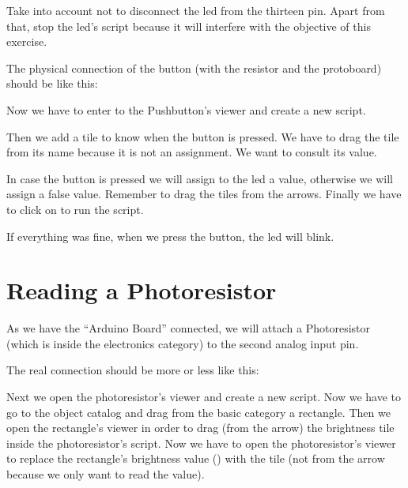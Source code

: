 \documentclass[english]{etoys-guide}
\begin{document}
Take into account not to disconnect the led from the thirteen pin. Apart from
that, stop the led’s script because it will interfere with the objective of
this exercise.

The physical connection of the button (with the resistor and the protoboard)
should be like this:



Now we have to enter to the Pushbutton’s viewer and create a new script. 


Then we add a \testtile{} tile to know when the button is pressed. We have to
drag the tile from its name because it is not an assignment. We want to consult
its value. 


In case the button is pressed we will assign to the led a  value,
otherwise we will assign a false value. Remember to drag the tiles from the
 arrows. Finally we have to click on 
to run the script. 


If everything was fine, when we press the button, the led will blink. 

\section{Reading a Photoresistor}

As we have the “Arduino Board” connected, we will attach a Photoresistor (which
is inside the electronics category) to the second analog input pin.


The real connection should be more or less like this:



Next we open the photoresistor’s viewer and create a new script. Now we have to
go to the object catalog and drag from the basic category a rectangle. Then we
open the rectangle’s viewer in order to drag (from the arrow) the brightness
tile inside the photoresistor’s script. Now we have to open the photoresistor’s
viewer to replace the rectangle’s brightness value () with the
 tile (not from the arrow because we only
want to read the value). 
\end{document}
